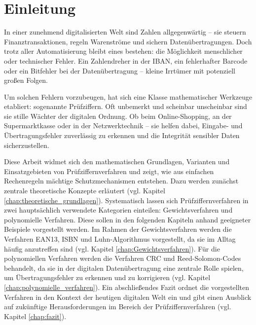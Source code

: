 
\chapter{Einleitung}

In einer zunehmend digitalisierten Welt sind Zahlen allgegenwärtig – sie steuern Finanztransaktionen, regeln Warenströme und sichern Datenübertragungen. Doch trotz aller Automatisierung bleibt eines bestehen: die Möglichkeit menschlicher oder technischer Fehler. Ein Zahlendreher in der IBAN, ein fehlerhafter Barcode oder ein Bitfehler bei der Datenübertragung – kleine Irrtümer mit potenziell großen Folgen.

Um solchen Fehlern vorzubeugen, hat sich eine Klasse mathematischer Werkzeuge etabliert: sogenannte Prüfziffern. Oft unbemerkt und scheinbar unscheinbar sind sie stille Wächter der digitalen Ordnung. Ob beim Online-Shopping, an der Supermarktkasse oder in der Netzwerktechnik – sie helfen dabei, Eingabe- und Übertragungsfehler zuverlässig zu erkennen und die Integrität sensibler Daten sicherzustellen.

Diese Arbeit widmet sich den mathematischen Grundlagen, Varianten und Einsatzgebieten von Prüfziffernverfahren und zeigt, wie aus einfachen Rechenregeln mächtige Schutzmechanismen entstehen. Dazu werden zunächst zentrale theoretische Konzepte erläutert (vgl. Kapitel \ref{chap:theoretische_grundlagen}). Systematisch lassen sich Prüfziffernverfahren in zwei hauptsächlich verwendete Kategorien einteilen: Gewichtsverfahren und polynomielle Verfahren. Diese sollen in den folgenden Kapiteln anhand geeigneter Beispiele vorgestellt werden. Im Rahmen der Gewichtsverfahren werden die Verfahren EAN13, ISBN und Luhn-Algorithmus vorgestellt, da sie im Alltag häufig anzutreffen sind (vgl. Kapitel \ref{chap:Gewichtsverfahren}). Für die polynomiellen Verfahren werden die Verfahren CRC und Reed-Solomon-Codes behandelt, da sie in der digitalen Datenübertragung eine zentrale Rolle spielen, um Übertragungsfehler zu erkennen und zu korrigieren (vgl. Kapitel \ref{chap:polynomielle_verfahren}).
Ein abschließendes Fazit ordnet die vorgestellten Verfahren in den Kontext der heutigen digitalen Welt ein und gibt einen Ausblick auf zukünftige Herausforderungen im Bereich der Prüfziffernverfahren (vgl. Kapitel \ref{chap:fazit}).




